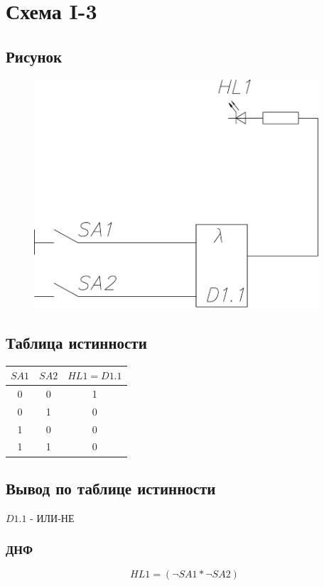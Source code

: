 \documentclass[a4paper]{article}
\begin{document}
\pagebreak

\section{Схема I-3}
\subsection{Рисунок}
\begin{figure}[H]
    \centering
    \includegraphics[width=300pt]{3.png}
\end{figure}
\subsection{Таблица истинности}
\begin{table}[ht]
    \centering
    \begin{tabular}{|c|c|c|}
        \hline
        $SA1$ & $SA2$ & $HL1 = D1.1$\\
        \hline
        0 & 0 & 1 \\
        0 & 1 & 0 \\
        1 & 0 & 0 \\
        1 & 1 & 0 \\
        \hline
    \end{tabular}
\end{table}

\subsection{Вывод по таблице истинности}
$D1.1$ - ИЛИ-НЕ
\subsubsection{ДНФ}
$$ HL1 = (\neg SA1 * \neg SA2) $$
\end{document}
